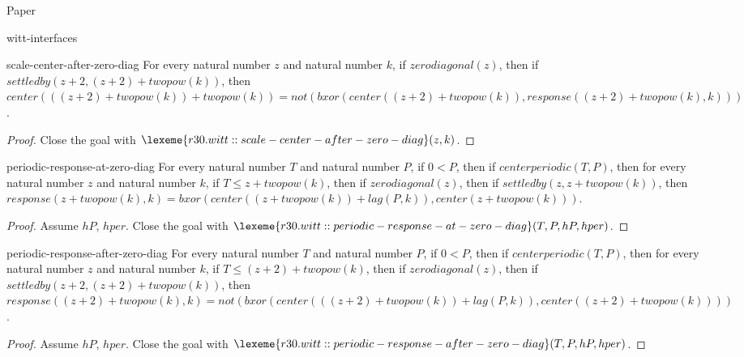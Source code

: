 \begin{lexlean}{Paper}
\begin{section}{witt-interfaces}
  \begin{theorem}{scale-center-after-zero-diag}
  For every natural number \(z\) and natural number \(k\), if \(zerodiagonal(z)\), then if \(settledby(z + 2, (z + 2) + twopow(k))\), then \(center(((z + 2) + twopow(k)) + twopow(k)) = not(bxor(center((z + 2) + twopow(k)), response((z + 2) + twopow(k), k)))\).
  \begin{proof}
  Close the goal with \(\lexeme{r30.witt::scale-center-after-zero-diag}(z, k)\).
  \end{proof}
  \end{theorem}

  \begin{theorem}{periodic-response-at-zero-diag}
  For every natural number \(T\) and natural number \(P\), if \(0 < P\), then if \(centerperiodic(T, P)\), then for every natural number \(z\) and natural number \(k\), if \(T ≤ z + twopow(k)\), then if \(zerodiagonal(z)\), then if \(settledby(z, z + twopow(k))\), then \(response(z + twopow(k), k) = bxor(center((z + twopow(k)) + lag(P, k)), center(z + twopow(k)))\).
  \begin{proof}
  Assume \(hP\), \(hper\).
  Close the goal with \(\lexeme{r30.witt::periodic-response-at-zero-diag}(T, P, hP, hper)\).
  \end{proof}
  \end{theorem}

  \begin{theorem}{periodic-response-after-zero-diag}
  For every natural number \(T\) and natural number \(P\), if \(0 < P\), then if \(centerperiodic(T, P)\), then for every natural number \(z\) and natural number \(k\), if \(T ≤ (z + 2) + twopow(k)\), then if \(zerodiagonal(z)\), then if \(settledby(z + 2, (z + 2) + twopow(k))\), then \(response((z + 2) + twopow(k), k) = not(bxor(center(((z + 2) + twopow(k)) + lag(P, k)), center((z + 2) + twopow(k))))\).
  \begin{proof}
  Assume \(hP\), \(hper\).
  Close the goal with \(\lexeme{r30.witt::periodic-response-after-zero-diag}(T, P, hP, hper)\).
  \end{proof}
  \end{theorem}


\end{section}
\end{lexlean}
